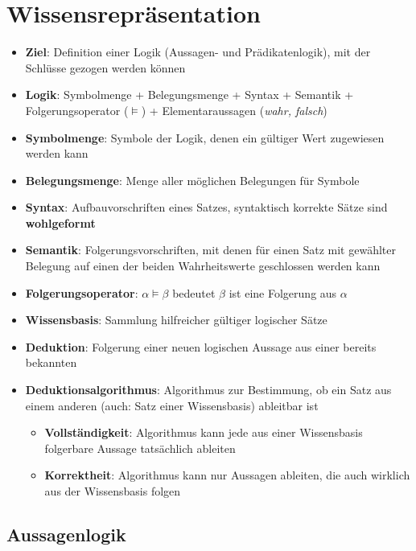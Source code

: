 \section{Wissensrepräsentation}%
\label{wrep:sec:wissensrepraesentation}

\begin{itemize}
	\item \textbf{Ziel}: Definition einer Logik (Aussagen- und Prädikatenlogik), mit der Schlüsse gezogen werden können
	\item \textbf{Logik}: Symbolmenge + Belegungsmenge + Syntax + Semantik + Folgerungsoperator ($\models$) + Elementaraussagen (\textit{wahr, falsch})
	\item \textbf{Symbolmenge}: Symbole der Logik, denen ein gültiger Wert zugewiesen werden kann
	\item \textbf{Belegungsmenge}: Menge aller möglichen Belegungen für Symbole
	\item \textbf{Syntax}: Aufbauvorschriften eines Satzes, syntaktisch korrekte Sätze sind \textbf{wohlgeformt}
	\item \textbf{Semantik}: Folgerungsvorschriften, mit denen für einen Satz mit gewählter Belegung auf einen der beiden Wahrheitswerte geschlossen werden kann
	\item \textbf{Folgerungsoperator}: $\alpha \models \beta$ bedeutet $\beta$ ist eine Folgerung aus $\alpha$
	\item \textbf{Wissensbasis}: Sammlung hilfreicher gültiger logischer Sätze
	\item \textbf{Deduktion}: Folgerung einer neuen logischen Aussage aus einer bereits bekannten
	\item \textbf{Deduktionsalgorithmus}: Algorithmus zur Bestimmung, ob ein Satz aus einem anderen (auch: Satz einer Wissensbasis) ableitbar ist
	\begin{itemize}
		\item \textbf{Vollständigkeit}: Algorithmus kann jede aus einer Wissensbasis folgerbare Aussage tatsächlich ableiten
		\item \textbf{Korrektheit}: Algorithmus kann nur Aussagen ableiten, die auch wirklich aus der Wissensbasis folgen
	\end{itemize}
\end{itemize}

\subsection{Aussagenlogik}%
\label{wrep:sub:aussagenlogik}

